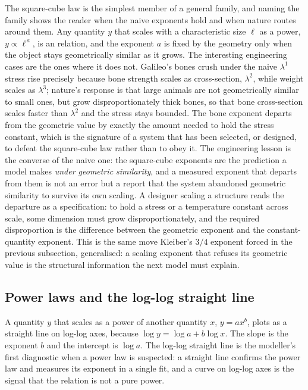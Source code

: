 The square-cube law is the simplest member of a general family, and
naming the family shows the reader when the naive exponents hold and
when nature routes around them. Any quantity $y$ that scales with a
characteristic size $\ell$ as a power, $y \propto \ell^{\,a}$, is an
 relation, and the exponent $a$ is fixed by the
geometry only when the object stays geometrically similar as it grows.
The interesting engineering cases are the ones where it does not.
Galileo's bones crush under the naive $\lambda^1$ stress rise precisely
because bone strength scales as cross-section, $\lambda^2$, while weight
scales as $\lambda^3$; nature's response is that large animals are not
geometrically similar to small ones, but grow disproportionately thick
bones, so that bone cross-section scales faster than $\lambda^2$ and the
stress stays bounded. The bone exponent departs from the geometric value
by exactly the amount needed to hold the stress constant, which is the
signature of a system that has been selected, or designed, to defeat the
square-cube law rather than to obey it. The engineering lesson is the
converse of the naive one: the square-cube exponents are the prediction a
model makes \emph{under geometric similarity}, and a measured exponent
that departs from them is not an error but a report that the system
abandoned geometric similarity to survive its own scaling. A designer
scaling a structure reads the departure as a specification: to hold a
stress or a temperature constant across scale, some dimension must grow
disproportionately, and the required disproportion is the difference
between the geometric exponent and the constant-quantity exponent. This
is the same move Kleiber's $3/4$ exponent forced in the previous
subsection, generalised: a scaling exponent that refuses its geometric
value is the structural information the next model must explain.

\subsection{Power laws and the log-log straight line}

A quantity $y$ that scales as a power of another quantity $x$,
$y = a x^{b}$, plots as a straight line on log-log axes, because
$\log y = \log a + b \log x$. The slope is the exponent $b$ and the
intercept is $\log a$. The log-log straight line is the modeller's
first diagnostic when a power law is suspected: a straight line confirms
the power law and measures its exponent in a single fit, and a curve on
log-log axes is the signal that the relation is not a pure power.

